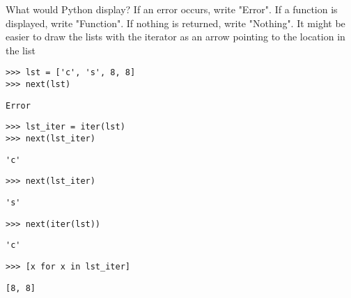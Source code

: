 \begin{blocksection}
\question What would Python display? If an error occurs, write "Error". If a function is displayed, write "Function". If nothing is returned, write "Nothing". It might be easier to draw the lists with the iterator as an arrow pointing to the location in the list

\begin{lstlisting}
>>> lst = ['c', 's', 8, 8]
>>> next(lst)
\end{lstlisting}
\begin{solution}[0.25in]
\begin{lstlisting}
Error

\end{lstlisting}
\end{solution}
\end{blocksection}

\begin{lstlisting}
>>> lst_iter = iter(lst)
>>> next(lst_iter)
\end{lstlisting}
\begin{solution}[0.25in]
\begin{lstlisting}
'c'
\end{lstlisting}
\end{solution}

\begin{lstlisting}
>>> next(lst_iter)
\end{lstlisting}
\begin{solution}[0.25in]
\begin{lstlisting}
's'
\end{lstlisting}
\end{solution}

\begin{lstlisting}
>>> next(iter(lst))
\end{lstlisting}
\begin{solution}[0.25in]
\begin{lstlisting}
'c'
\end{lstlisting}
\end{solution}

\begin{lstlisting}
>>> [x for x in lst_iter]
\end{lstlisting}
\begin{solution}[0.25in]
\begin{lstlisting}
[8, 8]
\end{lstlisting}
\end{solution}
